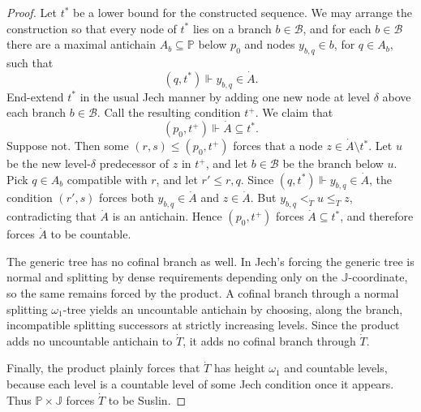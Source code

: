 \documentclass[11pt]{article}
\theoremstyle{plain}
\theoremstyle{definition}
\theoremstyle{remark}
\begin{document}
\begin{proof}
Let \(t^*\) be a lower bound for the constructed sequence.  We may arrange the
construction so that every node of \(t^*\) lies on a branch \(b\in\mathcal B\),
and for each \(b\in\mathcal B\) there are a maximal antichain
\(A_b\subseteq\mathbb P\) below \(p_0\) and nodes \(y_{b,q}\in b\), for
\(q\in A_b\), such that
\[
  (q,t^*)\Vdash y_{b,q}\in\dot A.
\]
End-extend \(t^*\) in the usual Jech manner by adding one new node at level
\(\delta\) above each branch \(b\in\mathcal B\).  Call the resulting condition
\(t^+\).  We claim that
\[
  (p_0,t^+)\Vdash \dot A\subseteq t^* .
\]
Suppose not.  Then some \((r,s)\leq(p_0,t^+)\) forces that a node
\(z\in\dot A\setminus t^*\).  Let \(u\) be the new level-\(\delta\) predecessor
of \(z\) in \(t^+\), and let \(b\in\mathcal B\) be the branch below \(u\).  Pick
\(q\in A_b\) compatible with \(r\), and let \(r'\leq r,q\).  Since
\((q,t^*)\Vdash y_{b,q}\in\dot A\), the condition \((r',s)\) forces both
\(y_{b,q}\in\dot A\) and \(z\in\dot A\).  But \(y_{b,q}<_{\dot T}u\leq_{\dot T}z\),
contradicting that \(\dot A\) is an antichain.  Hence \((p_0,t^+)\) forces
\(\dot A\subseteq t^*\), and therefore forces \(\dot A\) to be countable.

The generic tree has no cofinal branch as well.  In Jech's forcing the generic
tree is normal and splitting by dense requirements depending only on the
\(\mathbb J\)-coordinate, so the same remains forced by the product.  A cofinal
branch through a normal splitting \(\omega_1\)-tree yields an uncountable
antichain by choosing, along the branch, incompatible splitting successors at
strictly increasing levels.  Since the product adds no uncountable antichain to
\(\dot T\), it adds no cofinal branch through \(\dot T\).

Finally, the product plainly forces that \(\dot T\) has height \(\omega_1\) and
countable levels, because each level is a countable level of some Jech condition
once it appears.  Thus \(\mathbb P\times\mathbb J\) forces \(\dot T\) to be
Suslin.
\end{proof}
\end{document}
